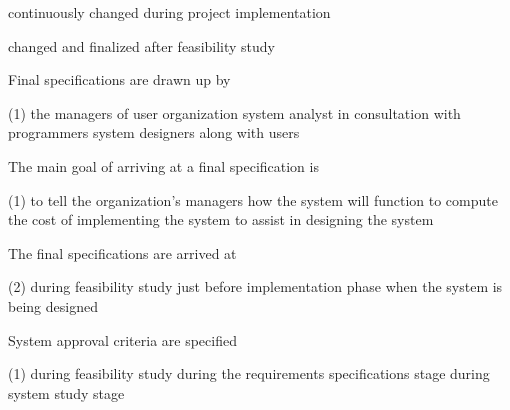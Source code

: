\documentclass{article}
\begin{document}
\begin{questions}
\begin{exercise}
\begin{choice}
            \choice continuously changed during project implementation

            \choice {}

            \choice changed and finalized after feasibility study
        \end{choice}
    \end{exercise}
    \begin{exercise}
        Final specifications are drawn up by
        \begin{choice}(1)
            \choice {}
            \choice the managers of user organization
            \choice system analyst in consultation with programmers
            \choice system designers along with users
        \end{choice}
    \end{exercise}
    \begin{exercise}
        The main goal of arriving at a final specification is
        \begin{choice}(1)
            \choice to tell the organization's managers how the system will function
            \choice {}
            \choice to compute the cost of implementing the system
            \choice to assist in designing the system
        \end{choice}
    \end{exercise}
    \begin{exercise}
        The final specifications are arrived at
        \begin{choice}(2)
            \choice {}
            \choice during feasibility study
            \choice just before implementation phase
            \choice when the system is being designed
        \end{choice}
    \end{exercise}
    \begin{exercise}
        System approval criteria are specified
        \begin{choice}(1)
            \choice {}
            \choice during feasibility study
            \choice during the requirements specifications stage
            \choice during system study stage
        \end{choice}
    \end{exercise}

\end{questions}
\end{document}
